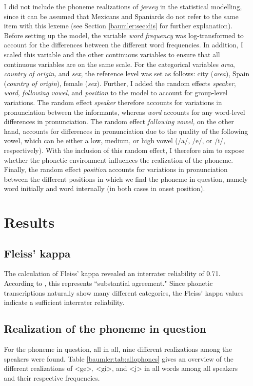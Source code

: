 \documentclass[output=paper]{langscibook}
\begin{document}
I did not include the phoneme realizations of \textit{jersey} in the statistical modelling, since it can be assumed that Mexicans and Spaniards do not refer to the same item with this lexeme (see Section \ref{baumler:sec:dis} for further explanation). Before setting up the model, the variable \textit{word frequency} was log-transformed to account for the differences between the different word frequencies. In addition, I scaled this variable and the other continuous variables to ensure that all continuous variables are on the same scale. 
For the categorical variables \textit{area}, \textit{country of origin,} and \textit{sex}, the reference level was set as follows: city (\textit{area}), Spain (\textit{country of origin}), female (\textit{sex}).
Further, I added the random effects \textit{speaker}, \textit{word}, \textit{following vowel,} and \textit{position} to the model to account for group-level variations. The random effect \textit{speaker} therefore accounts for variations in pronunciation between the informants, whereas \textit{word} accounts for any word-level differences in pronunciation. The random effect \textit{following vowel,} on the other hand, accounts for differences in pronunciation due to the quality of the following vowel, which can be either a low, medium, or high vowel (/a/, /e/, or /i/, respectively). With the inclusion of this random effect, I therefore aim to expose whether the phonetic environment influences the realization of the phoneme. Finally, the random effect \textit{position} accounts for variations in pronunciation between the different positions in which we find the phoneme in question, namely word initially and word internally (in both cases in onset position).


\section{Results}
\subsection{Fleiss' kappa}
The calculation of Fleiss' kappa revealed an interrater reliability of 0.71. According to \citet[]{Landis1977}, this represents “substantial agreement." Since phonetic transcriptions naturally show many different categories, the Fleiss' kappa values indicate a sufficient interrater reliability.

\subsection{Realization of the phoneme in question}
For the phoneme in question, all in all, nine different realizations among the speakers were found. Table \ref{baumler:tab:allophones} gives an overview of the different realizations of <ge>, <gi>, and <j> in all words among all speakers and their respective frequencies. 
\end{document}
